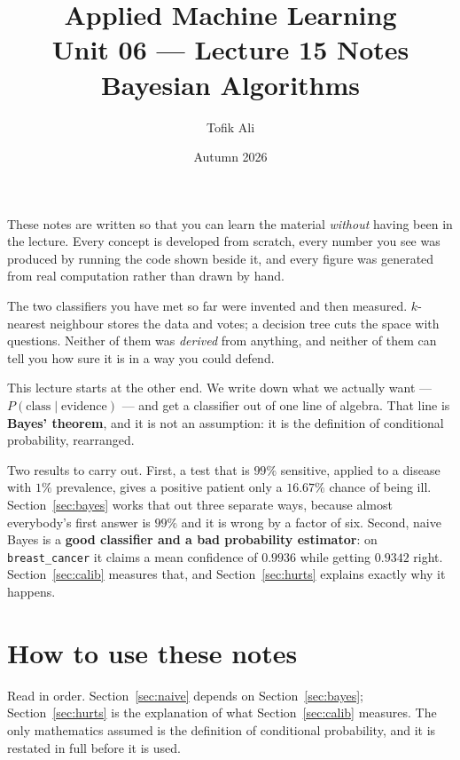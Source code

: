 \documentclass[11pt]{article}
\title{Applied Machine Learning\\Unit 06 --- Lecture 15 Notes\\
       Bayesian Algorithms}
\author{Tofik Ali}
\date{Autumn 2026}
\begin{document}
\maketitle

\begin{keyidea}
These notes are written so that you can learn the material \emph{without}
having been in the lecture. Every concept is developed from scratch, every
number you see was produced by running the code shown beside it, and every
figure was generated from real computation rather than drawn by hand.

The two classifiers you have met so far were invented and then measured.
$k$-nearest neighbour stores the data and votes; a decision tree cuts the
space with questions. Neither of them was \emph{derived} from anything, and
neither of them can tell you how sure it is in a way you could defend.

This lecture starts at the other end. We write down what we actually want ---
$P(\text{class} \mid \text{evidence})$ --- and get a classifier out of one
line of algebra. That line is \textbf{Bayes' theorem}, and it is not an
assumption: it is the definition of conditional probability, rearranged.

Two results to carry out. First, a test that is $99\%$ sensitive, applied to
a disease with $1\%$ prevalence, gives a positive patient only a
\textbf{$16.67\%$} chance of being ill. Section~\ref{sec:bayes} works that
out three separate ways, because almost everybody's first answer is $99\%$
and it is wrong by a factor of six. Second, naive Bayes is a \textbf{good
classifier and a bad probability estimator}: on \texttt{breast\_cancer} it
claims a mean confidence of $\mathbf{0.9936}$ while getting
$\mathbf{0.9342}$ right. Section~\ref{sec:calib} measures that, and
Section~\ref{sec:hurts} explains exactly why it happens.
\end{keyidea}

\tableofcontents
\medskip

\section{How to use these notes}
\label{sec:how}

Read in order. Section~\ref{sec:naive} depends on Section~\ref{sec:bayes};
Section~\ref{sec:hurts} is the explanation of what Section~\ref{sec:calib}
measures. The only mathematics assumed is the definition of conditional
probability, and it is restated in full before it is used.
\end{document}
